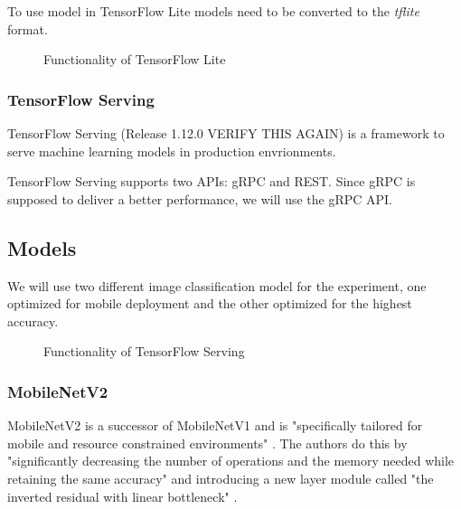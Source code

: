 To use model in TensorFlow Lite models need to be converted to the \emph{tflite} format.

\begin{figure}[H]
\centering

\caption{Functionality of TensorFlow Lite}
\label{fig:edge}
\end{figure}
\subsubsection{TensorFlow Serving}
TensorFlow Serving (Release 1.12.0 VERIFY THIS AGAIN) is a framework to serve machine learning models in production envrionments. 

TensorFlow Serving supports two APIs: gRPC and REST. Since gRPC is supposed to deliver a better performance, we will use the gRPC API.
\subsection{Models}
We will use two different image classification model for the experiment, one optimized for mobile deployment and the other optimized for the highest accuracy.
\begin{figure}[H]
\centering

\caption{Functionality of TensorFlow Serving}
\label{fig:cloud}
\end{figure}
\subsubsection{MobileNetV2}
MobileNetV2 is a successor of MobileNetV1 and is "specifically tailored for mobile and resource
constrained environments" \cite{DBLP:journals/corr/abs-1801-04381}. The authors do this by "significantly decreasing the number of operations and the memory needed while retaining the same accuracy"  \cite{DBLP:journals/corr/abs-1801-04381} and introducing a new layer module called "the
inverted residual with linear bottleneck" \cite{DBLP:journals/corr/abs-1801-04381}.

